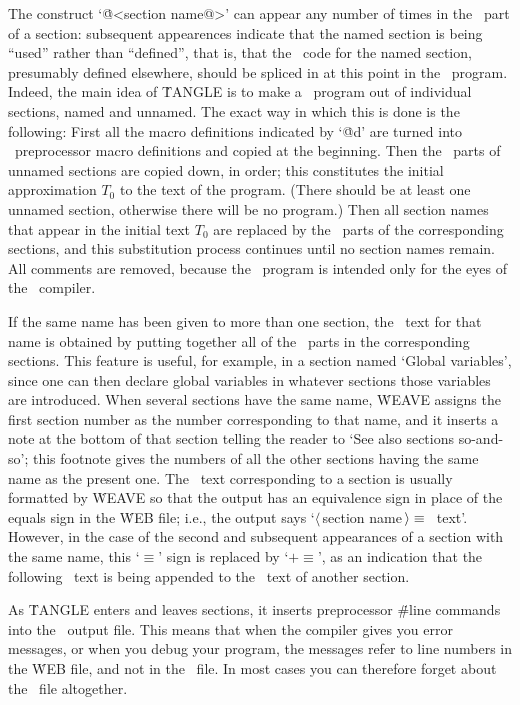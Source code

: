 The construct `\.{@<section name@>}' can appear
any number of times in the \Cee\ part of a section:
subsequent appearences indicate that the named section is being
``used'' rather than ``defined'', that is, that the
\Cee\ code for the named section, presumably defined elsewhere, should be
spliced in at this point in the \Cee\ program.  Indeed,
the main idea of \.{TANGLE} is to make a \Cee\ program out of
individual sections, named and unnamed.  The exact way in which this is done
is the following: First all the macro definitions
indicated by `\.{@d}' are turned into \Cee\ preprocessor macro definitions
and copied at the beginning.
Then the \Cee\ parts of unnamed sections are copied down,
in order; this constitutes the initial
approximation $T_0$ to the text of the program. (There should be at least
one unnamed section, otherwise there will be no program.) Then all section
names that appear in the initial text $T_0$ are replaced by the \Cee\
parts of the corresponding sections, and this substitution process
continues until no section names remain. All comments are removed, because
the \Cee\ program is intended only for the eyes of the \Cee\ compiler.

If the same name has been given to more than one section, the \Cee\ text
for that name is obtained by putting together all of the \Cee\ parts in
the corresponding sections. This feature is useful, for example, in a
section named `Global variables', since one can then
declare global variables in whatever sections those variables are
introduced. When several sections have the same name, \.{WEAVE} assigns the
first section number as the number corresponding to that name, and it
inserts a note at the bottom of that section telling the reader to `See
also sections so-and-so'; this footnote gives the numbers of all the other
sections having the same name as the present one. The \Cee\ text
corresponding to a section is usually formatted by \.{WEAVE} so that the
output has an equivalence sign in place of the equals sign in the \.{WEB}
file; i.e., the output says `$\langle\,$section
name$\,\rangle\equiv\null$\Cee\ text'. However, in the case of the second
and subsequent appearances of a section with the same name, this `$\equiv$'
sign is replaced by `$\mathrel+\equiv$', as an indication that the
following \Cee\ text is being appended to the \Cee\ text of another section.

As \.{TANGLE} enters and leaves sections, it inserts preprocessor
\.{\#line} commands into the \Cee\ output file.  This means that
when the compiler gives you error messages, or when you debug your program,
the messages refer to line numbers in the \.{WEB} file, and not in the
\Cee\ file.  In most cases you can therefore
forget about the \Cee\ file altogether.

